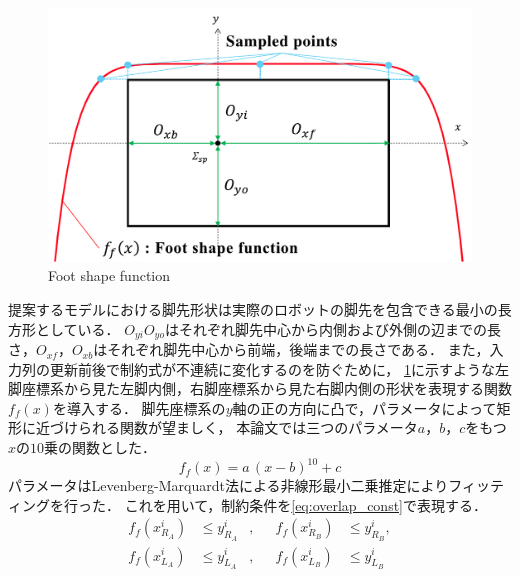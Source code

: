 \documentclass[autodetect-engine,dvipdfmx-if-dvi,ja=standard,a4j,jbase=11pt,magstyle=nomag*]{bxjsreport}
\begin{document}
\begin{figure}[t]
    \centering
    \includegraphics[width=0.9\linewidth, clip]{./figure/const_sole.pdf}
    \caption{Foot shape function}
    \label{fig:const_sole}
\end{figure}
%
提案するモデルにおける脚先形状は実際のロボットの脚先を包含できる最小の長方形としている．
$O_{yi}$$O_{yo}$はそれぞれ脚先中心から内側および外側の辺までの長さ，$O_{xf}$，$O_{xb}$はそれぞれ脚先中心から前端，後端までの長さである．
また，入力列の更新前後で制約式が不連続に変化するのを防ぐために，
\cref{fig:const_sole}に示すような左脚座標系から見た左脚内側，右脚座標系から見た右脚内側の形状を表現する関数$f_f ( x )$を導入する．
%
脚先座標系の$y$軸の正の方向に凸で，パラメータによって矩形に近づけられる関数が望ましく，
本論文では三つのパラメータ$a$，$b$，$c$をもつ$x$の$10$乗の関数とした．
\begin{equation} \label{eq:foot_shape}
    f_f ( x ) = a \, ( x - b )^{10} + c
\end{equation}
パラメータはLevenberg-Marquardt法による非線形最小二乗推定によりフィッティングを行った．
これを用いて，制約条件を\cref{eq:overlap_const}で表現する．
\begin{equation} \label{eq:overlap_const}
    \begin{aligned} 
        f_f \left( x_{R_A}^i \right) & \leq y_{R_A}^i &,&& f_f \left( x_{R_B}^i \right) & \leq y_{R_B}^i , \\ 
        f_f \left( x_{L_A}^i \right) & \leq y_{L_A}^i &,&& f_f \left( x_{L_B}^i \right) & \leq y_{L_B}^i
    \end{aligned}
\end{equation}
\end{document}

